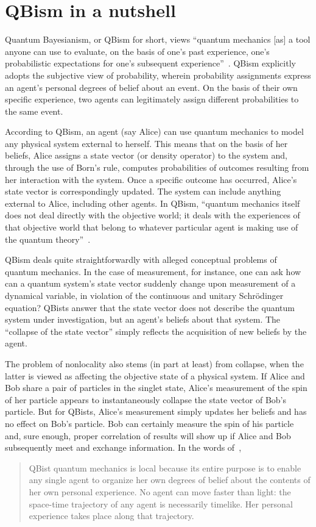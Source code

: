 \documentclass[12pt]{article}
\begin{document}
\section{QBism in a nutshell\label{S2}}
%
Quantum Bayesianism, or QBism for short,
views ``quantum mechanics [as] a tool
anyone can use to evaluate, on the basis
of one's past experience, one's probabilistic
expectations for one's subsequent
experience''~\cite{fuchs2}.  QBism explicitly
adopts the subjective view of probability,
wherein probability assignments express
an agent's personal degrees of belief
about an event.  On the basis of their
own specific experience, two agents can
legitimately assign different probabilities
to the same event.

According to QBism, an agent (say Alice)
can use quantum mechanics to model any
physical system external to herself.
This means that on the basis of her
beliefs, Alice assigns a state
vector (or density operator) to the
system and, through the use of Born's
rule, computes probabilities of outcomes
resulting from her interaction with the
system.  Once a specific outcome has
occurred, Alice's state vector is
correspondingly updated.  The system
can include anything external to Alice,
including other agents.  In QBism,
``quantum mechanics itself does not deal
directly with the objective world;
it deals with the experiences of that
objective world that belong to whatever
particular agent is making use of the
quantum theory''~\cite{fuchs2}. 

QBism deals quite straightforwardly
with alleged conceptual problems of
quantum mechanics.  In the case of
measurement, for instance, one can
ask how can a quantum
system's state vector suddenly change
upon measurement of a dynamical variable,
in violation of the continuous and
unitary Schr\"{o}dinger equation?
QBists answer that the state vector
does not describe the quantum system
under investigation, but an agent's
beliefs about that system.  The
``collapse of the state vector''
simply reflects the acquisition of
new beliefs by the agent.

The problem of nonlocality also stems
(in part at least) from collapse,
when the latter is viewed as
affecting the objective state of a physical
system.  If Alice and Bob share a
pair of particles in the singlet state,
Alice's measurement of the spin of her
particle appears to instantaneously
collapse the state
vector of Bob's particle.  But for QBists,
Alice's measurement simply updates her
beliefs and has no effect on Bob's
particle.  Bob can certainly measure the
spin of his particle and, sure enough,
proper correlation of results will show up if
Alice and Bob subsequently meet and exchange
information.  In the words of~\cite{fuchs2},
%
\begin{quote}
QBist quantum mechanics is local because
its entire purpose is to enable any single
agent to organize her own degrees of
belief about the contents of her own
personal experience. No agent can move
faster than light: the space-time trajectory
of any agent is necessarily timelike. Her
personal experience takes place along that
trajectory.
\end{quote}
\end{document}
